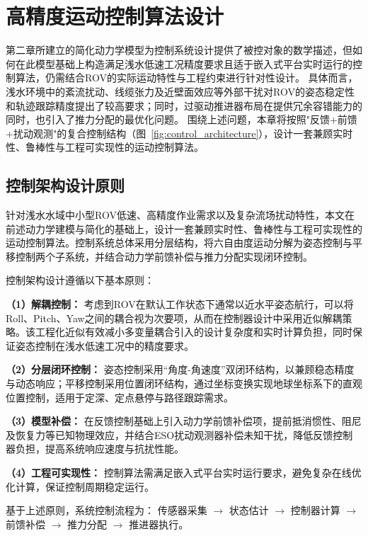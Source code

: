 
\chapter{高精度运动控制算法设计}

第二章所建立的简化动力学模型为控制系统设计提供了被控对象的数学描述，但如何在此模型基础上构造满足浅水低速工况精度要求且适于嵌入式平台实时运行的控制算法，仍需结合ROV的实际运动特性与工程约束进行针对性设计。
具体而言，浅水环境中的紊流扰动、线缆张力及近壁面效应等外部干扰对ROV的姿态稳定性和轨迹跟踪精度提出了较高要求；同时，过驱动推进器布局在提供冗余容错能力的同时，也引入了推力分配的最优化问题。
围绕上述问题，本章将按照"反馈+前馈+扰动观测"的复合控制结构（图~\ref{fig:control_architecture}），设计一套兼顾实时性、鲁棒性与工程可实现性的运动控制算法。

\section{控制架构设计原则}

针对浅水水域中小型ROV低速、高精度作业需求以及复杂流场扰动特性，本文在前述动力学建模与简化的基础上，设计一套兼顾实时性、鲁棒性与工程可实现性的运动控制算法。控制系统总体采用分层结构，将六自由度运动分解为姿态控制与平移控制两个子系统，并结合动力学前馈补偿与推力分配实现闭环控制。

控制架构设计遵循以下基本原则：

\noindent\textbf{（1）解耦控制：}  
考虑到ROV在默认工作状态下通常以近水平姿态航行，可以将Roll、Pitch、Yaw之间的耦合视为次要项，从而在控制器设计中采用近似解耦策略。该工程化近似有效减小多变量耦合引入的设计复杂度和实时计算负担，同时保证姿态控制在浅水低速工况中的精度要求。

\noindent\textbf{（2）分层闭环控制：}
姿态控制采用“角度-角速度”双闭环结构，以兼顾稳态精度与动态响应；平移控制采用位置闭环结构，通过坐标变换实现地球坐标系下的直观位置控制，适用于定深、定点悬停与路径跟踪需求。

\noindent\textbf{（3）模型补偿：}  
在反馈控制基础上引入动力学前馈补偿项，提前抵消惯性、阻尼及恢复力等已知物理效应，并结合ESO扰动观测器补偿未知干扰，降低反馈控制器负担，提高系统响应速度与抗扰性能。

\noindent\textbf{（4）工程可实现性：}  
控制算法需满足嵌入式平台实时运行要求，避免复杂在线优化计算，保证控制周期稳定运行。

基于上述原则，系统控制流程为：
传感器采集 $\rightarrow$ 状态估计 $\rightarrow$ 控制器计算 $\rightarrow$ 前馈补偿 $\rightarrow$ 推力分配 $\rightarrow$ 推进器执行。

